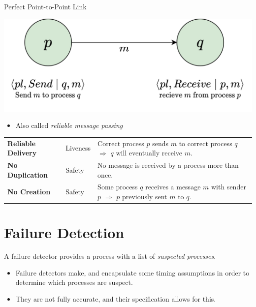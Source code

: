 \begin{definitionbox}{Perfect Point-to-Point Link}
    \begin{center}
        \includegraphics[width=.6\textwidth]{broadcast/images/perfect_links.drawio.png}
    \end{center}
    \begin{itemize}
        \item Also called \textit{reliable message passing}
    \end{itemize}
    \begin{center}
        \begin{tabular}{l l p{}}
            \textbf{Reliable Delivery} & Liveness & Correct process $p$ sends $m$ to correct process $q$ $\Rightarrow$ $q$ will eventually receive $m$. \\
            \textbf{No Duplication} & Safety & No message is received by a process more than once. \\
            \textbf{No Creation} & Safety & Some process $q$ receives a message $m$ with sender $p$ $\Rightarrow$ $p$ previously sent $m$ to $q$. \\
        \end{tabular}
    \end{center}
\end{definitionbox}

\section{Failure Detection}
A failure detector provides a process with a list of \textit{suspected processes}.
\begin{itemize}
  \item Failure detectors make, and encapsulate some timing assumptions in order to determine which processes are suspect.
  \item They are not fully accurate, and their specification allows for this.
\end{itemize}

